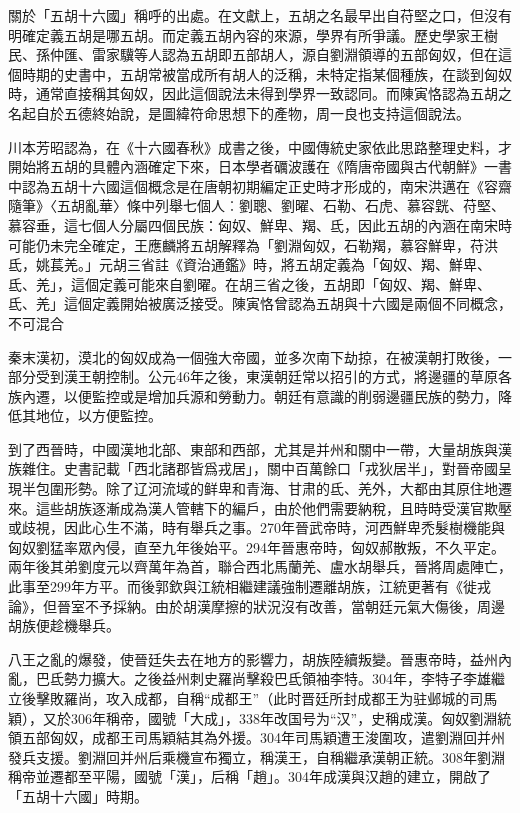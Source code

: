 關於「五胡十六國」稱呼的出處。在文獻上，五胡之名最早出自苻堅之口，但沒有明確定義五胡是哪五胡。而定義五胡內容的來源，學界有所爭議。歷史學家王樹民、孫仲匯、雷家驥等人認為五胡即五部胡人，源自劉淵領導的五部匈奴，但在這個時期的史書中，五胡常被當成所有胡人的泛稱，未特定指某個種族，在談到匈奴時，通常直接稱其匈奴，因此這個說法未得到學界一致認同。而陳寅恪認為五胡之名起自於五德終始說，是圖緯符命思想下的產物，周一良也支持這個說法。

川本芳昭認為，在《十六國春秋》成書之後，中國傳統史家依此思路整理史料，才開始將五胡的具體內涵確定下來，日本學者礪波護在《隋唐帝國與古代朝鮮》一書中認為五胡十六國這個概念是在唐朝初期編定正史時才形成的，南宋洪邁在《容齋隨筆》〈五胡亂華〉條中列舉七個人︰劉聰、劉曜、石勒、石虎、慕容皝、苻堅、慕容垂，這七個人分屬四個民族：匈奴、鮮卑、羯、氐，因此五胡的內涵在南宋時可能仍未完全確定，王應麟將五胡解釋為「劉淵匈奴，石勒羯，慕容鮮卑，苻洪氐，姚萇羌。」元胡三省註《資治通鑑》時，將五胡定義為「匈奴、羯、鮮卑、氐、羌」，這個定義可能來自劉曜。在胡三省之後，五胡即「匈奴、羯、鮮卑、氐、羌」這個定義開始被廣泛接受。陳寅恪曾認為五胡與十六國是兩個不同概念，不可混合

秦末漢初，漠北的匈奴成為一個強大帝國，並多次南下劫掠，在被漢朝打敗後，一部分受到漢王朝控制。公元46年之後，東漢朝廷常以招引的方式，將邊疆的草原各族內遷，以便監控或是增加兵源和勞動力。朝廷有意識的削弱邊疆民族的勢力，降低其地位，以方便監控。

到了西晉時，中國漢地北部、東部和西部，尤其是并州和關中一帶，大量胡族與漢族雜住。史書記載「西北諸郡皆爲戎居」，關中百萬餘口「戎狄居半」，對晉帝國呈現半包圍形勢。除了辽河流域的鲜卑和青海、甘肃的氐、羌外，大都由其原住地遷來。這些胡族逐漸成為漢人管轄下的編戶，由於他們需要納稅，且時時受漢官欺壓或歧視，因此心生不滿，時有舉兵之事。270年晉武帝時，河西鮮卑禿髮樹機能與匈奴劉猛率眾內侵，直至九年後始平。294年晉惠帝時，匈奴郝散叛，不久平定。兩年後其弟劉度元以齊萬年為首，聯合西北馬蘭羌、盧水胡舉兵，晉將周處陣亡，此事至299年方平。而後郭欽與江統相繼建議強制遷離胡族，江統更著有《徙戎論》，但晉室不予採納。由於胡漢摩擦的狀況沒有改善，當朝廷元氣大傷後，周邊胡族便趁機舉兵。

八王之亂的爆發，使晉廷失去在地方的影響力，胡族陸續叛變。晉惠帝時，益州內亂，巴氐勢力擴大。之後益州刺史羅尚擊殺巴氐領袖李特。304年，李特子李雄繼立後擊敗羅尚，攻入成都，自稱“成都王”（此时晋廷所封成都王为驻邺城的司馬穎），又於306年稱帝，國號「大成」，338年改国号为“汉”，史稱成漢。匈奴劉淵統領五部匈奴，成都王司馬穎結其為外援。304年司馬穎遭王浚圍攻，遣劉淵回并州發兵支援。劉淵回并州后乘機宣布獨立，稱漢王，自稱繼承漢朝正統。308年劉淵稱帝並遷都至平陽，國號「漢」，后稱「趙」。304年成漢與汉趙的建立，開啟了「五胡十六國」時期。

